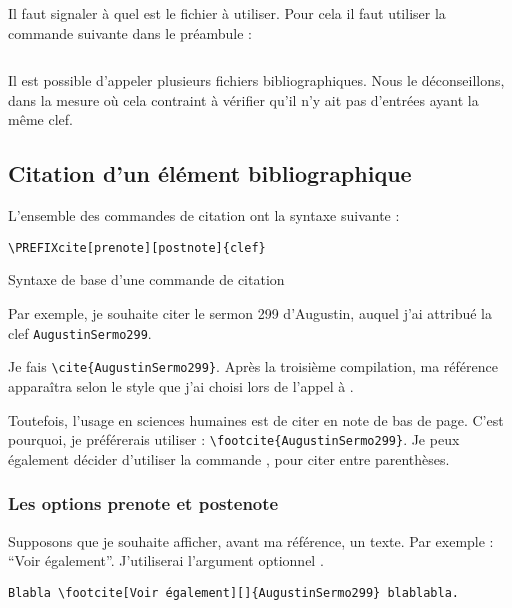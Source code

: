 Il faut signaler à  quel est le fichier  à utiliser. Pour cela il faut utiliser la commande suivante dans le préambule :

\begin{verbatim}

\end{verbatim}

\begin{attention}
Il est possible d'appeler plusieurs fichiers bibliographiques. Nous le déconseillons, dans la mesure où cela contraint à vérifier qu'il n'y ait pas d'entrées ayant la même clef.
\end{attention}

\subsection{Citation d'un élément bibliographique}

L'ensemble des commandes de citation ont la syntaxe suivante : 

\begin{listing}[ht]
\begin{verbatim}
\PREFIXcite[prenote][postnote]{clef}
\end{verbatim}
\caption{Syntaxe de base d'une commande de citation}
\end{listing}

Par exemple, je souhaite citer le sermon 299 d'Augustin, auquel j'ai attribué la clef \verb|AugustinSermo299|.

Je fais \verb|\cite{AugustinSermo299}|. Après la troisième compilation, ma référence apparaîtra selon le style que j'ai choisi lors de l'appel à  .

Toutefois, l'usage en sciences humaines est de citer en note de bas de page. C'est pourquoi, je préférerais utiliser : \verb|\footcite{AugustinSermo299}|. Je peux également décider d'utiliser la commande , pour citer entre parenthèses.

\subsubsection{Les options prenote et postenote}

Supposons que je souhaite afficher, avant ma référence, un texte. Par exemple : \enquote{Voir également}. J'utiliserai l'argument optionnel .

\begin{verbatim}
Blabla \footcite[Voir également][]{AugustinSermo299} blablabla.
\end{verbatim}

